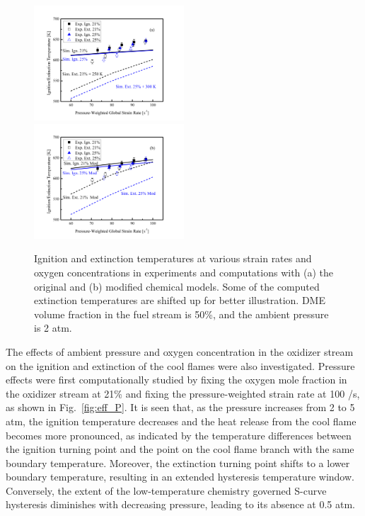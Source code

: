 \documentclass[review,3p,times]{elsarticle}
\begin{document}
\begin{figure}[t]
  \centering
  \scriptsize
  \includegraphics[trim=6.5mm 7.5mm 7mm 8mm, clip=true, width=0.5\textwidth]{cmp_O2.png}
  \includegraphics[trim=6.5mm 7.5mm 7mm 8mm, clip=true, width=0.5\textwidth]{cmp_O2_mod.png}
  \normalsize
  \caption{Ignition and extinction temperatures at various strain rates and oxygen concentrations in experiments and computations with (a) the original and (b) modified chemical models.  Some of the computed extinction temperatures are shifted up for better illustration.  DME volume fraction in the fuel stream is 50\%, and the ambient pressure is 2 atm.}
  \label{fig:cmp_O2}
\end{figure}


The effects of ambient pressure and oxygen concentration in the oxidizer stream on the ignition and extinction of the cool flames were also investigated.  Pressure effects were first computationally studied by fixing the oxygen mole fraction in the oxidizer stream at 21\% and fixing the pressure-weighted strain rate at 100 /s, as shown in Fig.~\ref{fig:eff_P}.  It is seen that, as the pressure increases from 2 to 5 atm, the ignition temperature decreases and the heat release from the cool flame becomes more pronounced, as indicated by the temperature differences between the ignition turning point and the point on the cool flame branch with the same boundary temperature.  Moreover, the extinction turning point shifts to a lower boundary temperature, resulting in an extended hysteresis temperature window.  Conversely, the extent of the low-temperature chemistry governed S-curve hysteresis diminishes with decreasing pressure, leading to its absence at 0.5 atm.
\end{document}
